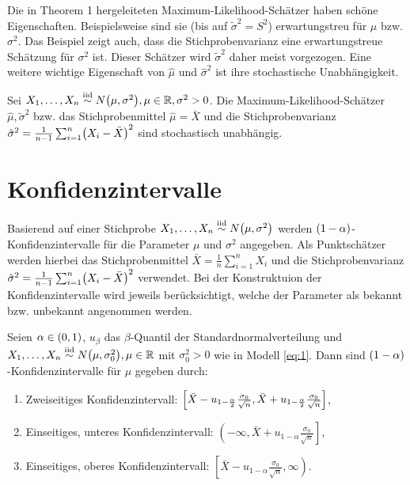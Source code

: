\documentclass{lecture}
\begin{document}
    Die in Theorem 1 hergeleiteten Maximum-Likelihood-Schätzer haben schöne Eigenschaften.
    Beispielsweise sind sie (bis auf \(\tilde{\sigma}^2 = S^2\)) erwartungstreu für \(\mu\) bzw. \(\sigma^2\).
    Das Beispiel zeigt auch, dass die Stichprobenvarianz eine erwartungstreue Schätzung für \(\sigma^2\) ist.
    Dieser Schätzer wird \(\tilde{\sigma}^2\) daher meist vorgezogen.
    Eine weitere wichtige Eigenschaft von \(\hat{\mu}\) und \(\hat{\sigma}^2\) ist ihre stochastische Unabhängigkeit.
    
    \begin{theorem}
        Sei \(X_1, \ldots, X_n \stackrel{\text{iid}}{\sim} N\parentheses*{\mu, \sigma^2}, \mu \in \R, \sigma^2 > 0\).
        Die Maximum-Likelihood-Schätzer \(\hat{\mu}, \tilde{\sigma}^2\) bzw. das Stichprobenmittel \(\hat{\mu} = \bar{X}\) und die Stichprobenvarianz \(\hat{\sigma}^2 = \frac{1}{n - 1}\sum_{i = 1}^n \parentheses*{X_i - \bar{X}}^2\) sind stochastisch unabhängig.
    \end{theorem}
    
    
    \section*{Konfidenzintervalle}
    
    Basierend auf einer Stichprobe \(X_1, \ldots, X_n \stackrel{\text{iid}}{\sim} N\parentheses*{\mu, \sigma^2}\) werden \(\parentheses*{1 - \alpha}\)-Konfidenzintervalle für die Parameter \(\mu\) und \(\sigma^2\) angegeben.
    Als Punktschätzer werden hierbei das Stichprobenmittel \(\bar{X} = \frac{1}{n}\sum_{i = 1}^n X_i\) und die Stichprobenvarianz \(\hat{\sigma}^2 = \frac{1}{n - 1}\sum_{i = 1}^n \parentheses*{X_i -\bar{X}}^2\) verwendet.
    Bei der Konstruktuion der Konfidenzintervalle wird jeweils berücksichtigt, welche der Parameter als bekannt bzw. unbekannt angenommen werden.
    
    \begin{theorem}
        Seien \(\alpha \in \parentheses*{0, 1}\), \(u_\beta\) das \(\beta\)-Quantil der Standardnormalverteilung und \(X_1, \ldots, X_n \stackrel{\text{iid}}{\sim} N\parentheses*{\mu, \sigma_0^2}, \mu \in \R\) mit \(\sigma_0^2 > 0\) wie in Modell \eqref{eq:1}.
        Dann sind \(\parentheses*{1 - \alpha}\)-Konfidenzintervalle für \(\mu\) gegeben durch:
        \begin{enumerate}
            \item Zweiseitiges Konfidenzintervall: \(\brackets*{\bar{X} - u_{1 - \frac{\alpha}{2}}\frac{\sigma_0}{\sqrt{n}}, \bar{X} + u_{1 - \frac{\alpha}{2}}\frac{\sigma_0}{\sqrt{n}}}\),
            \item Einseitiges, unteres Konfidenzintervall: \(\left(-\infty, \bar{X} + u_{1 - \alpha}\frac{\sigma_0}{\sqrt{n}}\right]\),
            \item Einseitiges, oberes Konfidenzintervall: \(\left[\bar{X} - u_{1 - \alpha}\frac{\sigma_0}{\sqrt{n}}, \infty\right)\).
        \end{enumerate}
    \end{theorem}
    
\end{document}
